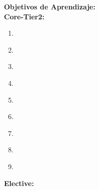 \noindent \textbf{Objetivos de Aprendizaje:}\\
\noindent \textbf{Core-Tier2:}
\begin{enumerate}
	\setcounter{enumi}{0}
	\item \SESoftwareProjectManagementLODiscussCommon\xspace[\SESoftwareProjectManagementLODiscussCommonLevel]\label{sec:BOK:SESoftwareProjectManagementLODiscussCommon}
	\item \SESoftwareProjectManagementLOCreateAndAgenda\xspace[\SESoftwareProjectManagementLOCreateAndAgendaLevel]\label{sec:BOK:SESoftwareProjectManagementLOCreateAndAgenda}
	\item \SESoftwareProjectManagementLOIdentifyAndRoles\xspace[\SESoftwareProjectManagementLOIdentifyAndRolesLevel]\label{sec:BOK:SESoftwareProjectManagementLOIdentifyAndRoles}
	\item \SESoftwareProjectManagementLOUnderstandTheAnd\xspace[\SESoftwareProjectManagementLOUnderstandTheAndLevel]\label{sec:BOK:SESoftwareProjectManagementLOUnderstandTheAnd}
	\item \SESoftwareProjectManagementLOApplyAStrategy\xspace[\SESoftwareProjectManagementLOApplyAStrategyLevel]\label{sec:BOK:SESoftwareProjectManagementLOApplyAStrategy}
	\item \SESoftwareProjectManagementLOUseAn\xspace[\SESoftwareProjectManagementLOUseAnLevel]\label{sec:BOK:SESoftwareProjectManagementLOUseAn}
	\item \SESoftwareProjectManagementLOListSeveral\xspace[\SESoftwareProjectManagementLOListSeveralLevel]\label{sec:BOK:SESoftwareProjectManagementLOListSeveral}
	\item \SESoftwareProjectManagementLODescribeTheRiskSoftware\xspace[\SESoftwareProjectManagementLODescribeTheRiskSoftwareLevel]\label{sec:BOK:SESoftwareProjectManagementLODescribeTheRiskSoftware}
	\item \SESoftwareProjectManagementLODescribeDifferent\xspace[\SESoftwareProjectManagementLODescribeDifferentLevel]\label{sec:BOK:SESoftwareProjectManagementLODescribeDifferent}
\end{enumerate}
\noindent \textbf{Elective:}
